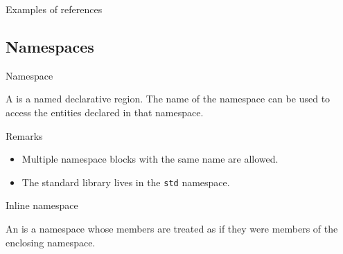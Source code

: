 \begin{frame}{Examples of references}{}
  \begin{examples}[References]
    \small
  \end{examples}
\end{frame}



\subsection{Namespaces}

\begin{frame}{Namespace}{}
  \begin{definition}[Namespace]
  A  is a named declarative region. The name of the namespace can be used to access the entities declared in that namespace.
  \end{definition}

  \begin{block}{Remarks}
    \begin{itemize}
    \item
      Multiple namespace blocks with the same name are allowed.
    \item
      The standard library lives in the \lstinline!std! namespace.
    \end{itemize}
  \end{block}

  \begin{example}[Namespace]
  \end{example}
\end{frame}

\begin{frame}{Inline namespace}{}
  \begin{definition}
    An  is a namespace whose members are treated as if they were members of the enclosing namespace.
  \end{definition}

  \begin{example}
  \end{example}
\end{frame}

